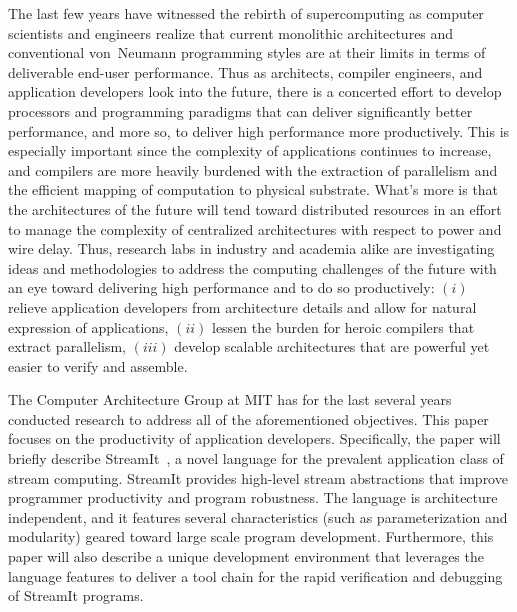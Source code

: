 \documentclass[11pt, letterpaper, onecolumn]{article}
\begin{document}
The last  few years  have witnessed the  rebirth of  supercomputing as
computer  scientists  and engineers  realize  that current  monolithic
architectures  and conventional von~Neumann  programming styles  are at
their  limits in terms  of deliverable  end-user performance.  Thus as
architects, compiler  engineers, and application  developers look into
the  future, there  is a  concerted effort  to develop  processors and
programming   paradigms   that   can  deliver   significantly   better
performance,   and  more   so,  to   deliver  high   performance  more
productively.  This is  especially important  since the  complexity of
applications  continues to  increase, and  compilers are  more heavily
burdened with the extraction  of parallelism and the efficient mapping
of  computation  to  physical  substrate.  What's  more  is  that  the
architectures of the future  will tend toward distributed resources in
an effort  to manage the complexity of  centralized architectures with
respect to power  and wire delay. Thus, research  labs in industry and
academia alike  are investigating  ideas and methodologies  to address
the computing challenges  of the future with an  eye toward delivering
high performance and to  do so productively: $(i)$ relieve application
developers from architecture details  and allow for natural expression
of  applications, $(ii)$ lessen  the burden  for heroic  compilers that
extract parallelism,  $(iii)$ develop scalable  architectures that are
powerful yet easier to verify and assemble.

The Computer Architecture Group at  MIT has for the last several years
conducted  research to  address all  of the  aforementioned objectives.
This   paper    focuses   on   the    productivity   of   application
developers.   Specifically,   the    paper   will   briefly   describe
StreamIt~\cite{streamitcc},  a   novel  language  for   the  prevalent
application  class of stream  computing. StreamIt  provides high-level
stream abstractions  that improve programmer  productivity and program
robustness.  The language is architecture independent, and it features
several  characteristics  (such  as parameterization  and  modularity)
geared  toward  large scale  program  development.  Furthermore,  this
paper  will  also  describe  a  unique  development  environment  that
leverages the language  features to deliver a tool chain  for the rapid
verification and debugging of StreamIt programs.
\end{document}
